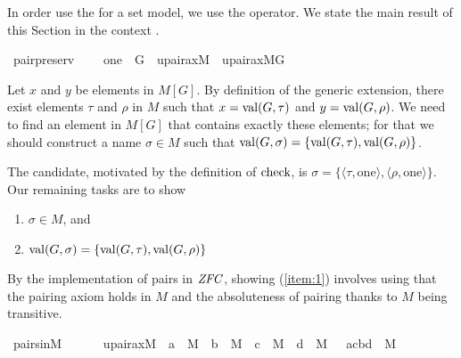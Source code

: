 In order use the  for a set model, we
use the \isatt{\#\#}  operator.  We state the main result of this
Section in the context .  
%
\begin{isabelle}
\isamarkupfalse%
\ pair{\isacharunderscore}preserv\ {\isacharcolon}\ \isanewline
\ \ {\isachardoublequoteopen}one\ {\isasymin}\ G\ {\isasymLongrightarrow}\ upair{\isacharunderscore}ax{\isacharparenleft}{\isacharhash}{\isacharhash}M{\isacharparenright}\ {\isasymLongrightarrow}\ upair{\isacharunderscore}ax{\isacharparenleft}{\isacharhash}{\isacharhash}M{\isacharbrackleft}G{\isacharbrackright}{\isacharparenright}{\isachardoublequoteclose}
\end{isabelle}

Let $x$ and $y$ be elements in $M[G]$. By definition of the generic extension, there exist
elements $\tau$ and $\rho$ in $M$ such that $x = \operatorname{val}(G,\tau)$ and
$y = \operatorname{val}(G,\rho)$.  We need to find an element in $M[G]$ that contains exactly
these elements; for that we should construct a name $\sigma\in M$ such that
$\operatorname{val}(G,\sigma) = \{ \operatorname{val}(G,\tau) , \operatorname{val}(G,\rho) \}$. 

The candidate, motivated by the definition of $\operatorname{check}$,  is
$\sigma = \{\langle \tau , \mathrm{one} \rangle , \langle \rho , \mathrm{one} \rangle \}$. 
Our remaining tasks are to show 
\begin{enumerate}
  \item \label{item:1}$\sigma \in M$, and
  \item \label{item:2} $\operatorname{val}(G,\sigma) = \{ \operatorname{val}(G,\tau) , \operatorname{val}(G,\rho) \}$
\end{enumerate}

By the implementation of pairs  in $\mathit{ZFC}$, showing (\ref{item:1})
involves using that the
pairing axiom holds in $M$ and the absoluteness of pairing
thanks to $M$ being transitive. 

\begin{isabelle}
\isamarkupfalse%
\ pairs{\isacharunderscore}in{\isacharunderscore}M\ {\isacharcolon}\ \isanewline
\ \ {\isachardoublequoteopen}\ {\isasymlbrakk}\ upair{\isacharunderscore}ax{\isacharparenleft}{\isacharhash}{\isacharhash}M{\isacharparenright}\ {\isacharsemicolon}\ a\ {\isasymin}\ M\ {\isacharsemicolon}\ b\ {\isasymin}\ M\ {\isacharsemicolon}\ c\ {\isasymin}\ M\ {\isacharsemicolon}\ d\ {\isasymin}\ M\ {\isasymrbrakk}\ {\isasymLongrightarrow}\ {\isacharbraceleft}{\isasymlangle}a{\isacharcomma}c{\isasymrangle}{\isacharcomma}{\isasymlangle}b{\isacharcomma}d{\isasymrangle}{\isacharbraceright}\ {\isasymin}\ M{\isachardoublequoteclose}
\end{isabelle}

